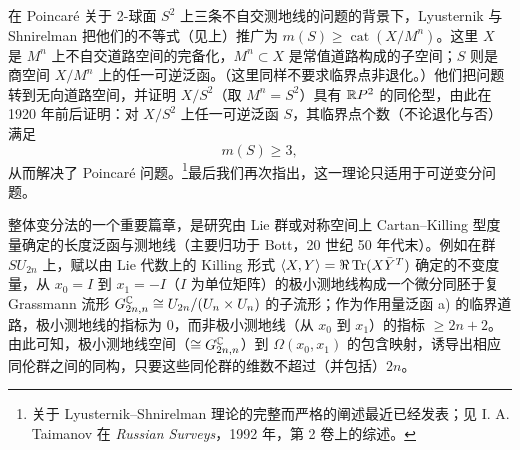 在 Poincaré 关于 2-球面 $S^2$ 上三条不自交测地线的问题的背景下，Lyusternik 与 Shnirelman 把他们的不等式（见上）推广为 $m(S)\ge\operatorname{cat}(X/M^n)$。这里 $X$ 是 $M^n$ 上不自交道路空间的完备化，$M^n\subset X$ 是常值道路构成的子空间；$S$ 则是商空间 $X/M^n$ 上的任一可逆泛函。（这里同样不要求临界点非退化。）他们把问题转到无向道路空间，并证明 $X/S^2$（取 $M^n=S^2$）具有 $\mathbb{R}P^2$ 的同伦型，由此在 1920 年前后证明：对 $X/S^2$ 上任一可逆泛函 $S$，其临界点个数（不论退化与否）满足
\[
  m(S)\ge3,
\]
从而解决了 Poincaré 问题。\footnote{关于 Lyusternik--Shnirelman 理论的完整而严格的阐述最近已经发表；见 I. A. Taimanov 在 \emph{Russian Surveys}，1992 年，第 2 卷上的综述。}最后我们再次指出，这一理论只适用于可逆变分问题。

整体变分法的一个重要篇章，是研究由 Lie 群或对称空间上 Cartan--Killing 型度量确定的长度泛函与测地线（主要归功于 Bott，20 世纪 50 年代末）。例如在群 $SU_{2n}$ 上，赋以由 Lie 代数上的 Killing 形式 $\langle X,Y\rangle=\Re\operatorname{Tr}(X\bar Y^T)$ 确定的不变度量，从 $x_0=I$ 到 $x_1=-I$（$I$ 为单位矩阵）的极小测地线构成一个微分同胚于复 Grassmann 流形 $G^{\mathbb{C}}_{2n,n}\cong U_{2n}/(U_n\times U_n)$ 的子流形；作为作用量泛函 a) 的临界道路，极小测地线的指标为 0，而非极小测地线（从 $x_0$ 到 $x_1$）的指标 $\ge2n+2$。由此可知，极小测地线空间（$\cong G^{\mathbb{C}}_{2n,n}$）到 $\Omega(x_0,x_1)$ 的包含映射，诱导出相应同伦群之间的同构，只要这些同伦群的维数不超过（并包括）$2n$。

